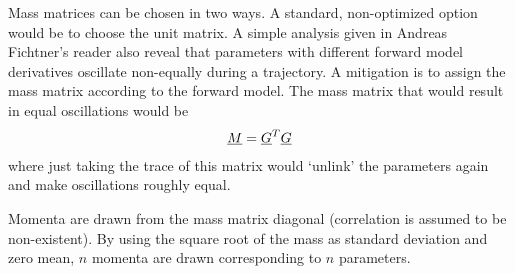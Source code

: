 Mass matrices can be chosen in two ways. A standard, non-optimized option would be to choose the unit matrix. A simple analysis given in Andreas Fichtner's reader also reveal that parameters with different forward model derivatives oscillate non-equally during a trajectory. A mitigation is to assign the mass matrix according to the forward model. The mass matrix that would result in equal oscillations would be 
\begin{gather}
\underline{M} = \underline{G}^T \underline{G}
\end{gather}
where just taking the trace of this matrix would `unlink' the parameters again and make oscillations roughly equal.

 Momenta are drawn from the mass matrix diagonal (correlation is assumed to be non-existent). By using the square root of the mass as standard deviation and zero mean, $n$ momenta are drawn corresponding to $n$ parameters.